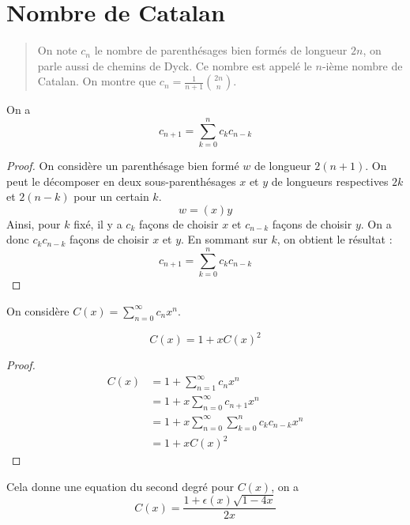 \documentclass[../main.tex]{subfiles}
\begin{document}
\section{Nombre de Catalan}
\begin{abstract}
    On note \(c_n\) le nombre de parenthésages bien formés de longueur \(2n\), on parle aussi
    de chemins de Dyck. Ce nombre est appelé le \(n\)-ième nombre de Catalan. On montre que \(c_n = \frac{1}{n+1}\binom{2n}{n}\).
\end{abstract}
\begin{proposition} On a 
    \begin{equation}
        c_{n+1} = \sum_{k=0}^n c_kc_{n-k}
    \end{equation}
\end{proposition}
\begin{proof} On considère un parenthésage bien formé \(w\) de longueur \(2(n+1)\). On peut
    le décomposer en deux sous-parenthésages \(x\) et \(y\) de longueurs respectives \(2k\) et \(2(n-k)\) pour un certain \(k\).
    \begin{equation}
        w = (x)y
    \end{equation}
    Ainsi, pour \(k\) fixé, il y a \(c_k\) façons de choisir \(x\) et \(c_{n-k}\) façons de choisir \(y\). On a donc
    \(c_kc_{n-k}\) façons de choisir \(x\) et \(y\). En sommant sur \(k\), on obtient le résultat :
    \begin{equation}
        c_{n+1} = \sum_{k=0}^n c_kc_{n-k}
    \end{equation}
\end{proof}
On considère \(C(x) = \sum_{n=0}^\infty c_nx^n\).
\begin{proposition}
    \begin{equation}
        C(x) = 1 + xC(x)^2
    \end{equation}
\end{proposition}
\begin{proof}
    \begin{align}
        C(x) & = 1 + \sum_{n=1}^\infty c_nx^n\\
        & = 1 + x\sum_{n=0}^\infty c_{n+1}x^n\\
        &= 1 + x \sum_{n=0}^\infty \sum_{k=0}^n c_kc_{n-k}x^n\\
        & = 1 + x C(x)^2
    \end{align}
\end{proof}
Cela donne une equation du second degré pour \(C(x)\), on a 
\begin{equation}
    C(x) = \frac{1 + \epsilon(x) \sqrt{1-4x}}{2x}
\end{equation}
\end{document}

